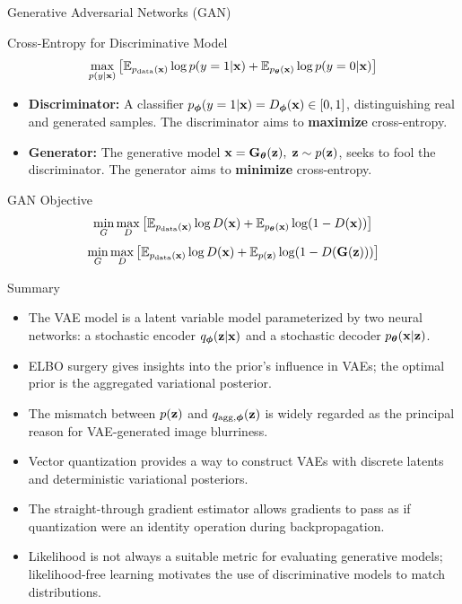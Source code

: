 \documentclass{beamer}
\begin{document}
\begin{frame}{Generative Adversarial Networks (GAN)}
	\begin{block}{Cross-Entropy for Discriminative Model}
		\vspace{-0.3cm}
		\[
			\max_{p(y | \mathbf{x})} \left[\mathbb{E}_{p_{\text{data}}(\mathbf{x})} \log p(y = 1 | \mathbf{x}) + \mathbb{E}_{p_{\boldsymbol{\theta}}(\mathbf{x})} \log p(y = 0 | \mathbf{x}) \right] 
		\]
	\end{block}
	\eqpause
	\begin{itemize}
		\item \textbf{Discriminator:} A classifier $p_{\boldsymbol{\phi}}(y = 1 | \mathbf{x}) = D_{\boldsymbol{\phi}}(\mathbf{x}) \in [0, 1]$, distinguishing real and generated samples. The discriminator aims to \textbf{maximize} cross-entropy.
		\item \textbf{Generator:} The generative model $\mathbf{x} = \mathbf{G}_{\boldsymbol{\theta}}(\mathbf{z}),\; \mathbf{z} \sim p(\mathbf{z})$, seeks to fool the discriminator. The generator aims to \textbf{minimize} cross-entropy.
	\end{itemize}
	\eqpause
	\begin{block}{GAN Objective}
		\vspace{-0.5cm}
		\[
			\min_{G} \max_D \left[ \mathbb{E}_{p_{\text{data}}(\mathbf{x})} \log D(\mathbf{x}) + \mathbb{E}_{p_{\boldsymbol{\theta}}(\mathbf{x})} \log (1 - D(\mathbf{x})) \right] 
		\]
		\eqpause
		\[
			\min_{G} \max_D \left[ \mathbb{E}_{p_{\text{data}}(\mathbf{x})} \log D(\mathbf{x}) + \mathbb{E}_{p(\mathbf{z})} \log (1 - D(\mathbf{G}(\mathbf{z}))) \right]
		\]
	\end{block}
\end{frame}
\begin{frame}{Summary}
	\begin{itemize}
		\item The VAE model is a latent variable model parameterized by two neural networks: a stochastic encoder $q_{\boldsymbol{\phi}}(\mathbf{z}| \mathbf{x})$ and a stochastic decoder $p_{\boldsymbol{\theta}}(\mathbf{x} | \mathbf{z})$.
		\vfill
		\item ELBO surgery gives insights into the prior's influence in VAEs; the optimal prior is the aggregated variational posterior.
		\vfill
		\item The mismatch between $p(\mathbf{z})$ and $q_{\text{agg}, \boldsymbol{\phi}}(\mathbf{z})$ is widely regarded as the principal reason for VAE-generated image blurriness.		
		\vfill
		\item Vector quantization provides a way to construct VAEs with discrete latents and deterministic variational posteriors.
		\vfill
		\item The straight-through gradient estimator allows gradients to pass as if quantization were an identity operation during backpropagation.			
		\vfill
		\item Likelihood is not always a suitable metric for evaluating generative models; likelihood-free learning motivates the use of discriminative models to match distributions.
	\end{itemize}
\end{frame}
\end{document}
